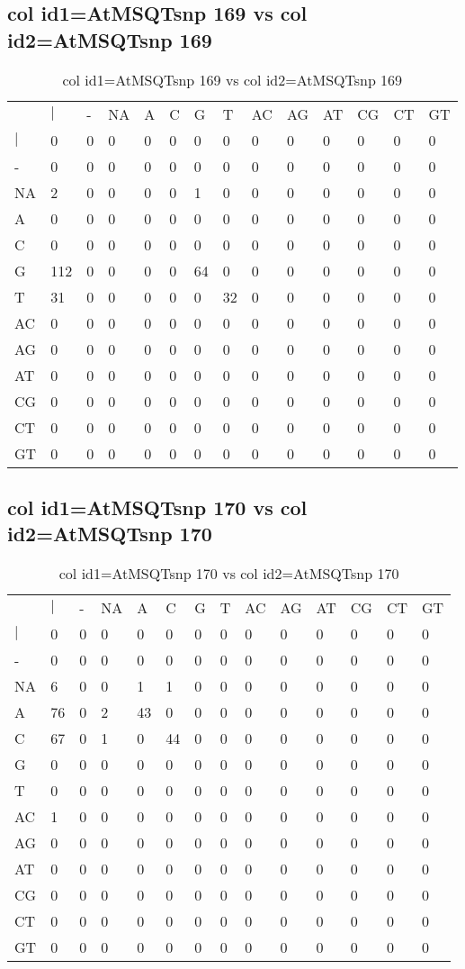 \subsection{col id1=AtMSQTsnp 169 vs col id2=AtMSQTsnp 169}
\begin{center}
\begin{longtable}{|l|l|l|l|l|l|l|l|l|l|l|l|l|l|}
\caption{col id1=AtMSQTsnp 169 vs col id2=AtMSQTsnp 169} \label{table_dm540}\\
\hline
\\
\hline
&$|$&-&NA&A&C&G&T&AC&AG&AT&CG&CT&GT\\
$|$&0&0&0&0&0&0&0&0&0&0&0&0&0\\
-&0&0&0&0&0&0&0&0&0&0&0&0&0\\
NA&2&0&0&0&0&1&0&0&0&0&0&0&0\\
A&0&0&0&0&0&0&0&0&0&0&0&0&0\\
C&0&0&0&0&0&0&0&0&0&0&0&0&0\\
G&112&0&0&0&0&64&0&0&0&0&0&0&0\\
T&31&0&0&0&0&0&32&0&0&0&0&0&0\\
AC&0&0&0&0&0&0&0&0&0&0&0&0&0\\
AG&0&0&0&0&0&0&0&0&0&0&0&0&0\\
AT&0&0&0&0&0&0&0&0&0&0&0&0&0\\
CG&0&0&0&0&0&0&0&0&0&0&0&0&0\\
CT&0&0&0&0&0&0&0&0&0&0&0&0&0\\
GT&0&0&0&0&0&0&0&0&0&0&0&0&0\\
\hline
\end{longtable}
\end{center}

\subsection{col id1=AtMSQTsnp 170 vs col id2=AtMSQTsnp 170}
\begin{center}
\begin{longtable}{|l|l|l|l|l|l|l|l|l|l|l|l|l|l|}
\caption{col id1=AtMSQTsnp 170 vs col id2=AtMSQTsnp 170} \label{table_dm542}\\
\hline
\\
\hline
&$|$&-&NA&A&C&G&T&AC&AG&AT&CG&CT&GT\\
$|$&0&0&0&0&0&0&0&0&0&0&0&0&0\\
-&0&0&0&0&0&0&0&0&0&0&0&0&0\\
NA&6&0&0&1&1&0&0&0&0&0&0&0&0\\
A&76&0&2&43&0&0&0&0&0&0&0&0&0\\
C&67&0&1&0&44&0&0&0&0&0&0&0&0\\
G&0&0&0&0&0&0&0&0&0&0&0&0&0\\
T&0&0&0&0&0&0&0&0&0&0&0&0&0\\
AC&1&0&0&0&0&0&0&0&0&0&0&0&0\\
AG&0&0&0&0&0&0&0&0&0&0&0&0&0\\
AT&0&0&0&0&0&0&0&0&0&0&0&0&0\\
CG&0&0&0&0&0&0&0&0&0&0&0&0&0\\
CT&0&0&0&0&0&0&0&0&0&0&0&0&0\\
GT&0&0&0&0&0&0&0&0&0&0&0&0&0\\
\hline
\end{longtable}
\end{center}


